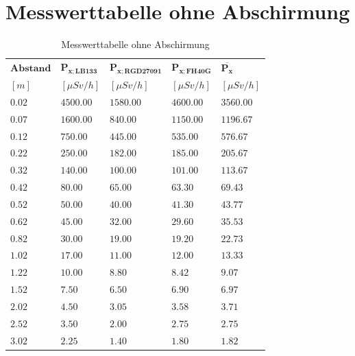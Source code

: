 \documentclass[12pt,german]{article}
\begin{document}
    \section{Messwerttabelle ohne Abschirmung}
    \begin{table}[H]
        \begin{tabularx}{\textwidth}{X|X|X|X|X}
            \toprule
            \( \mathbf{Abstand} \) & \( \mathbf{P_{x; LB 133}} \) & \( \mathbf{P_{x; RGD 27091}} \) & \( \mathbf{P_{x; FH40G}} \) & \( \mathbf{\overline{P_x}} \) \\
            $[m]$ & $[\mu Sv/h]$ & $[\mu Sv/h]$ & $[\mu Sv/h]$ & $[\mu Sv/h]$ \\
            \midrule
            $   0.02 $ & $ 4500.00 $ & $ 1580.00 $ & $ 4600.00 $ & $ 3560.00 $ \\
            $   0.07 $ & $ 1600.00 $ & $ 840.00 $ & $ 1150.00 $ & $ 1196.67 $ \\
            $   0.12 $ & $ 750.00 $ & $ 445.00 $ & $ 535.00 $ & $ 576.67 $ \\
            $   0.22 $ & $ 250.00 $ & $ 182.00 $ & $ 185.00 $ & $ 205.67 $ \\
            $   0.32 $ & $ 140.00 $ & $ 100.00 $ & $ 101.00 $ & $ 113.67 $ \\
            $   0.42 $ & $  80.00 $ & $  65.00 $ & $  63.30 $ & $  69.43 $ \\
            $   0.52 $ & $  50.00 $ & $  40.00 $ & $  41.30 $ & $  43.77 $ \\
            $   0.62 $ & $  45.00 $ & $  32.00 $ & $  29.60 $ & $  35.53 $ \\
            $   0.82 $ & $  30.00 $ & $  19.00 $ & $  19.20 $ & $  22.73 $ \\
            $   1.02 $ & $  17.00 $ & $  11.00 $ & $  12.00 $ & $  13.33 $ \\
            $   1.22 $ & $  10.00 $ & $   8.80 $ & $   8.42 $ & $   9.07 $ \\
            $   1.52 $ & $   7.50 $ & $   6.50 $ & $   6.90 $ & $   6.97 $ \\
            $   2.02 $ & $   4.50 $ & $   3.05 $ & $   3.58 $ & $   3.71 $ \\
            $   2.52 $ & $   3.50 $ & $   2.00 $ & $   2.75 $ & $   2.75 $ \\
            $   3.02 $ & $   2.25 $ & $   1.40 $ & $   1.80 $ & $   1.82 $ \\
            \bottomrule
        \end{tabularx}
        \caption{Messwerttabelle ohne Abschirmung}
    \end{table}
\end{document}
